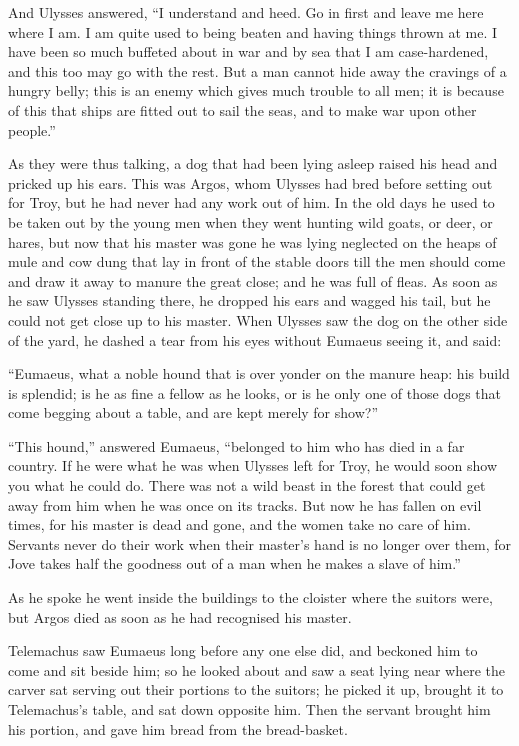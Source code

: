 And Ulysses answered, “I understand and heed. Go in first and leave me here
where I am. I am quite used to being beaten and having things thrown at me. I
have been so much buffeted about in war and by sea that I am case-hardened, and
this too may go with the rest. But a man cannot hide away the cravings of a
hungry belly; this is an enemy which gives much trouble to all men; it is
because of this that ships are fitted out to sail the seas, and to make war
upon other people.”

As they were thus talking, a dog that had been lying asleep raised his head and
pricked up his ears. This was Argos, whom Ulysses had bred before setting out
for Troy, but he had never had any work out of him. In the old days he used to
be taken out by the young men when they went hunting wild goats, or deer, or
hares, but now that his master was gone he was lying neglected on the heaps of
mule and cow dung that lay in front of the stable doors till the men should
come and draw it away to manure the great close; and he was full of fleas. As
soon as he saw Ulysses standing there, he dropped his ears and wagged his tail,
but he could not get close up to his master. When Ulysses saw the dog on the
other side of the yard, he dashed a tear from his eyes without Eumaeus seeing
it, and said:

“Eumaeus, what a noble hound that is over yonder on the manure heap: his build
is splendid; is he as fine a fellow as he looks, or is he only one of those
dogs that come begging about a table, and are kept merely for show?”

“This hound,” answered Eumaeus, “belonged to him who has died in a far country.
If he were what he was when Ulysses left for Troy, he would soon show you what
he could do. There was not a wild beast in the forest that could get away from
him when he was once on its tracks. But now he has fallen on evil times, for
his master is dead and gone, and the women take no care of him. Servants never
do their work when their master’s hand is no longer over them, for Jove takes
half the goodness out of a man when he makes a slave of him.”

As he spoke he went inside the buildings to the cloister where the suitors
were, but Argos died as soon as he had recognised his master.

Telemachus saw Eumaeus long before any one else did, and beckoned him to come
and sit beside him; so he looked about and saw a seat lying near where the
carver sat serving out their portions to the suitors; he picked it up, brought
it to Telemachus’s table, and sat down opposite him. Then the servant brought
him his portion, and gave him bread from the bread-basket.

